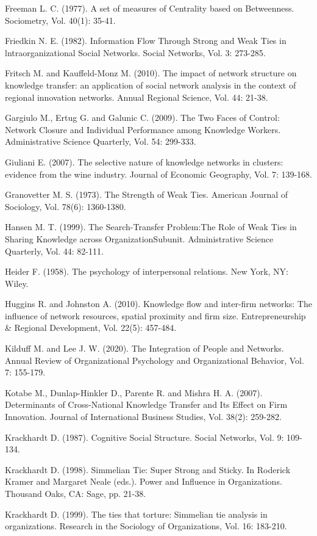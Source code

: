 \documentclass{article}
\begin{document}
\begin{hangparas}{.25in}{1}
Freeman L. C. (1977). A set of measures of Centrality based on Betweenness. Sociometry, Vol. 40(1): 35-41.

Friedkin N. E. (1982). Information Flow Through Strong and Weak Ties in lntraorganizational Social Networks. Social Networks, Vol. 3: 273-285. 

Fritsch M. and Kauffeld-Monz M. (2010). The impact of network structure on knowledge transfer: an application of social network analysis in the context of regional innovation networks. Annual Regional Science, Vol. 44: 21-38.

Gargiulo M., Ertug G. and Galunic C. (2009). The Two Faces of Control: Network Closure and Individual Performance among Knowledge Workers. Administrative Science Quarterly, Vol. 54: 299-333.

Giuliani E. (2007). The selective nature of knowledge networks in clusters: evidence from the wine industry. Journal of Economic Geography, Vol. 7: 139-168.

Granovetter M. S. (1973). The Strength of Weak Ties. American Journal of Sociology, Vol. 78(6): 1360-1380.

Hansen M. T. (1999). The Search-Transfer Problem:The Role of Weak Ties in Sharing Knowledge across OrganizationSubunit. Administrative Science Quarterly, Vol. 44: 82-111. 

Heider F. (1958). The psychology of interpersonal relations. New York, NY: Wiley.

Huggins R. and Johnston A. (2010). Knowledge flow and inter-firm networks: The influence of network resources, spatial proximity and firm size. Entrepreneurship & Regional Development, Vol. 22(5): 457-484.

Kilduff M. and Lee J. W. (2020). The Integration of People and Networks. Annual Review of Organizational Psychology and Organizational Behavior, Vol. 7: 155-179.

Kotabe M., Dunlap-Hinkler D., Parente R. and Mishra H. A. (2007). Determinants of Cross-National Knowledge Transfer and Its Effect on Firm Innovation. Journal of International Business Studies, Vol. 38(2): 259-282.

Krackhardt D. (1987). Cognitive Social Structure. Social Networks, Vol. 9: 109-134.

Krackhardt D. (1998). Simmelian Tie: Super Strong and Sticky. In Roderick Kramer and Margaret Neale (eds.). Power and Influence in Organizations. Thousand Oaks, CA: Sage, pp. 21-38.

Krackhardt D. (1999). The ties that torture: Simmelian tie analysis in organizations. Research in the Sociology of Organizations, Vol. 16: 183-210.


\end{hangparas}
\end{document}
